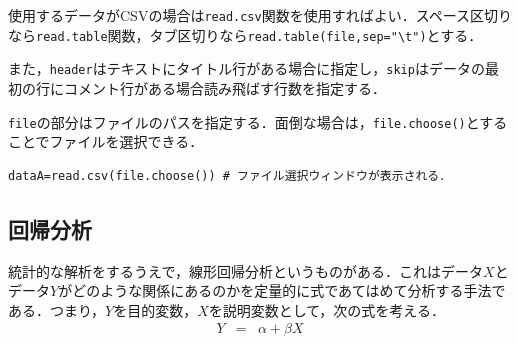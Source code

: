\documentclass[a4paper,10pt,fleqn]{jarticle}
\begin{document}
使用するデータがCSVの場合は{\tt read.csv}関数を使用すればよい．スペース区切りなら{\tt read.table}関数，タブ区切りなら{\tt read.table(file,sep="\verb+\+t")}とする．

また，{\tt header}はテキストにタイトル行がある場合に指定し，{\tt skip}はデータの最初の行にコメント行がある場合読み飛ばす行数を指定する．

{\tt file}の部分はファイルのパスを指定する．面倒な場合は，{\tt file.choose()}とすることでファイルを選択できる．
\begin{screen}
\begin{verbatim}
dataA=read.csv(file.choose()) # ファイル選択ウィンドウが表示される．
\end{verbatim}
\end{screen}
\subsection{回帰分析}
統計的な解析をするうえで，線形回帰分析というものがある．これはデータ$X$とデータ$Y$がどのような関係にあるのかを定量的に式であてはめて分析する手法である．つまり，$Y$を目的変数，$X$を説明変数として，次の式を考える．
\begin{eqnarray*}
Y&=&\alpha +\beta X
\end{eqnarray*}
\end{document}
